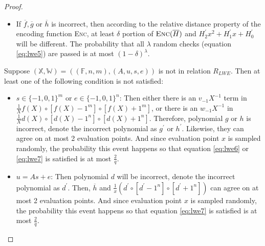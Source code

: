 \begin{proof}
\begin{itemize}
    \item If $\overline{f}, \overline{g}$ or $\overline{h}$ is incorrect, then according to the relative distance property of the encoding function \textsc{Enc}, at least $\delta$ portion of $\textsc{Enc}(\overline{H})$ and $H_2^\prime x^2 + H_1^\prime x + H_0^\prime$ will be different. The probability that all $\lambda$ random checks (equation \ref{eq:lwe5}) are passed is at most $(1 - \delta)^\lambda$.
\end{itemize}

Suppose $(\mathbb{X}, \mathbb{W}) = ((\mathbb{F}, n, m), (A, u, s, e))$ is not in relation $R_{LWE}$. Then at least one of the following condition is not satisfied:
\begin{itemize}
    \item $s \in \{-1, 0, 1\}^{m}$ or $e \in \{-1, 0, 1\}^{n}$: Then either there is an $v_{-1} X^{-1}$ term in $\frac{1}{X} f(X) \circ [f(X) - 1^m] \circ [f(X) + 1^m]$, or there is an  $w_{-1} X^{-1}$ in $\frac{1}{X} d(X) \circ [d(X) - 1^n] \circ [d(X) + 1^n]$. Therefore, polynomial $g$ or $h$ is incorrect, denote the incorrect polynomial as $g^\prime$ or $h^\prime$. Likewise, they can agree on at most 2 evaluation points. And since evaluation point $x$ is sampled randomly, the probability this event happens so that equation \ref{eq:lwe6} or \ref{eq:lwe7} is satisfied is at most $\frac{2}{q}$. 
    
    \item $u = As + e$: Then polynomial $d$ will be incorrect, denote the incorrect polynomial as $d^\prime$. Then, $\overline{h}$ and $\frac{1}{x} (d^\prime \circ [d^\prime - 1^n] \circ [d^\prime + 1^n])$ can agree on at most 2 evaluation points. And since evaluation point $x$ is sampled randomly, the probability this event happens so that equation \ref{eq:lwe7} is satisfied is at most $\frac{2}{q}$. 
    
\end{itemize}
\end{proof}


